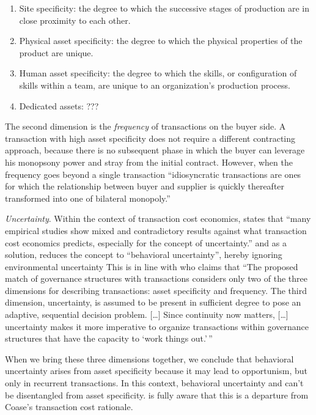 \documentclass[12pt]{article}
\providecommand{\tightlist}{%
  \setlength{\itemsep}{0pt}\setlength{\parskip}{0pt}}
\begin{document}
\begin{enumerate}
\def\labelenumi{\arabic{enumi}.}
\tightlist
\item
  Site specificity: the degree to which the successive stages of
  production are in close proximity to each other.
\item
  Physical asset specificity: the degree to which the physical
  properties of the product are unique.
\item
  Human asset specificity: the degree to which the skills, or
  configuration of skills within a team, are unique to an organization's
  production process.
\item
  Dedicated assets: ???
\end{enumerate}

The second dimension is the \emph{frequency} of transactions on the
buyer side. A transaction with high asset specificity does not require a
different contracting approach, because there is no subsequent phase in
which the buyer can leverage his monopsony power and stray from the
initial contract. However, when the frequency goes beyond a single
transaction ``idiosyncratic transactions are ones for which the
relationship between buyer and supplier is quickly thereafter
transformed into one of bilateral monopoly.'' \citep[
241]{williamson1985}

\emph{Uncertainty}. Within the context of transaction cost economics,
\citet[38]{shin2003} states that ``many empirical studies show mixed and
contradictory results against what transaction cost economics predicts,
especially for the concept of uncertainty.'' and as a solution, reduces
the concept to ``behavioral uncertainty'', hereby ignoring environmental
uncertainty \citep[ 391-392]{watjatrakul2005} This is in line with
\citet[79]{williamson1985} who claims that ``The proposed match of
governance structures with transactions considers only two of the three
dimensions for describing transactions: asset specificity and frequency.
The third dimension, uncertainty, is assumed to be present in sufficient
degree to pose an adaptive, sequential decision problem. {[}\ldots{]}
Since continuity now matters, {[}\ldots{]} uncertainty makes it more
imperative to organize transactions within governance structures that
have the capacity to `work things out.'\,''

When we bring these three dimensions together, we conclude that
behavioral uncertainty arises from asset specificity because it may lead
to opportunism, but only in recurrent transactions. In this context,
behavioral uncertainty and can't be disentangled from asset specificity.
\citet[78]{williamson1985} is fully aware that this is a departure from
Coase's transaction cost rationale.
\end{document}
